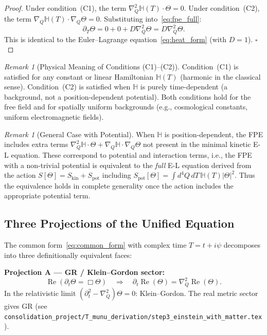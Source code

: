 \documentclass[12pt,a4paper]{article}
\theoremstyle{definition}
\theoremstyle{remark}
\newtheorem{remark}[theorem]{Remark}
\begin{document}
\begin{proof}
Under condition~(C1), the term $\nabla_Q^2\mathbb{H}(T)\cdot\Theta = 0$.
Under condition~(C2), the term $\nabla_Q\mathbb{H}(T)\cdot\nabla_Q\Theta = 0$.
Substituting into~\eqref{eq:fpe_full}:
\begin{equation}
  \partial_T\Theta = 0 + 0 + D\nabla_Q^2\Theta = D\nabla_Q^2\Theta.
\end{equation}
This is identical to the Euler--Lagrange equation~\eqref{eq:heat_form} (with $D=1$). $\square$
\end{proof}

\begin{remark}[Physical Meaning of Conditions (C1)--(C2)]
Condition~(C1) is satisfied for any constant or linear Hamiltonian $\mathbb{H}(T)$
(harmonic in the classical sense).  Condition~(C2) is satisfied when $\mathbb{H}$
is purely time-dependent (a background, not a position-dependent potential).
Both conditions hold for the free field and for spatially uniform backgrounds
(e.g., cosmological constants, uniform electromagnetic fields).
\end{remark}

\begin{remark}[General Case with Potential]
When $\mathbb{H}$ is position-dependent, the FPE includes extra terms
$\nabla_Q^2\mathbb{H}\cdot\Theta + \nabla_Q\mathbb{H}\cdot\nabla_Q\Theta$
not present in the minimal kinetic E-L equation.  These correspond to
potential and interaction terms, i.e., the FPE with a non-trivial potential
is equivalent to the \emph{full} E-L equation derived from the action
$S[\Theta] = S_{\mathrm{kin}} + S_{\mathrm{pot}}$ including
$S_{\mathrm{pot}}[\Theta] = \int d^4Q\,dT\,\mathbb{H}(T)|\Theta|^2$.
Thus the equivalence holds in complete generality once the action includes
the appropriate potential term.
\end{remark}

\subsection{Three Projections of the Unified Equation}
\label{subsec:three_projections}

The common form~\eqref{eq:common_form} with complex time $T = t + i\psi$ decomposes
into three definitionally equivalent faces:

\begin{resultbox}
\textbf{Projection A --- GR / Klein--Gordon sector:}
\begin{equation}
  \operatorname{Re}\!\left(\partial_t\Theta = \Box\Theta\right)
  \quad\Longrightarrow\quad
  \partial_t\operatorname{Re}(\Theta) = \nabla_Q^2\operatorname{Re}(\Theta).
\label{eq:proj_A}
\end{equation}
In the relativistic limit $(\partial_t^2 - \nabla_Q^2)\Theta = 0$: Klein--Gordon.
The real metric sector gives GR (see
\texttt{consolidation\_project/T\_munu\_derivation/step3\_einstein\_with\_matter.tex}).
\end{resultbox}
\end{document}
